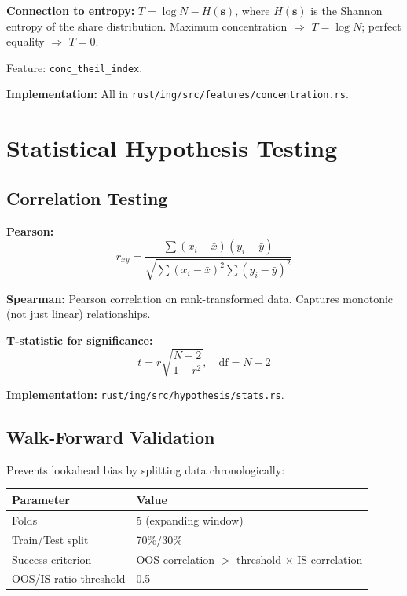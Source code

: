 \documentclass[11pt,a4paper]{article}
\begin{document}
\textbf{Connection to entropy:} $T = \log N - H(\mathbf{s})$, where $H(\mathbf{s})$ is the Shannon entropy of the share distribution. Maximum concentration $\Rightarrow$ $T = \log N$; perfect equality $\Rightarrow$ $T = 0$.

Feature: \texttt{conc\_theil\_index}.

\textbf{Implementation:} All in \texttt{rust/ing/src/features/concentration.rs}.

\newpage
\section{Statistical Hypothesis Testing}

\subsection{Correlation Testing}

\textbf{Pearson:}
\begin{equation}
r_{xy} = \frac{\sum (x_i - \bar{x})(y_i - \bar{y})}{\sqrt{\sum (x_i - \bar{x})^2 \sum (y_i - \bar{y})^2}}
\end{equation}

\textbf{Spearman:} Pearson correlation on rank-transformed data. Captures monotonic (not just linear) relationships.

\textbf{T-statistic for significance:}
\begin{equation}
t = r \sqrt{\frac{N - 2}{1 - r^2}}, \quad \text{df} = N - 2
\end{equation}

\textbf{Implementation:} \texttt{rust/ing/src/hypothesis/stats.rs}.

\subsection{Walk-Forward Validation}

Prevents lookahead bias by splitting data chronologically:

\begin{center}
\begin{tabular}{l l}
\hline
\textbf{Parameter} & \textbf{Value} \\
\hline
Folds & 5 (expanding window) \\
Train/Test split & 70\%/30\% \\
Success criterion & OOS correlation $>$ threshold $\times$ IS correlation \\
OOS/IS ratio threshold & 0.5 \\
\hline
\end{tabular}
\end{center}
\end{document}
